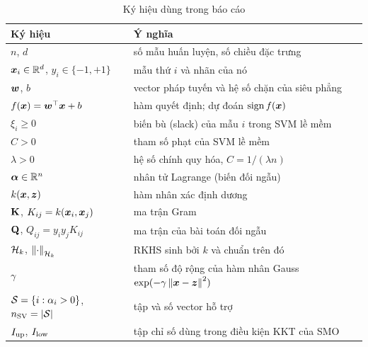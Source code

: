 \begin{table}[H]
\centering
\caption{Ký hiệu dùng trong báo cáo}\label{tab:notation}
\begin{tabular}{@{}ll@{}}
\toprule
Ký hiệu & Ý nghĩa \\
\midrule
$n$, $d$ & số mẫu huấn luyện, số chiều đặc trưng \\
$\bm{x}_i \in \mathbb{R}^d$, $y_i \in \{-1, +1\}$ & mẫu thứ $i$ và nhãn của nó \\
$\bm{w}$, $b$ & vector pháp tuyến và hệ số chặn của siêu phẳng \\
$f(\bm{x}) = \bm{w}^{\top}\bm{x} + b$ & hàm quyết định; dự đoán $\operatorname{sign} f(\bm{x})$ \\
$\xi_i \ge 0$ & biến bù (slack) của mẫu $i$ trong SVM lề mềm \\
$C > 0$ & tham số phạt của SVM lề mềm \\
$\lambda > 0$ & hệ số chính quy hóa, $C = 1/(\lambda n)$ \\
$\bm{\alpha} \in \mathbb{R}^n$ & nhân tử Lagrange (biến đối ngẫu) \\
$k(\bm{x}, \bm{z})$ & hàm nhân xác định dương \\
$\mathbf{K}$, $K_{ij} = k(\bm{x}_i, \bm{x}_j)$ & ma trận Gram \\
$\mathbf{Q}$, $Q_{ij} = y_i y_j K_{ij}$ & ma trận của bài toán đối ngẫu \\
$\mathcal{H}_k$, $\left\lVert \cdot \right\rVert_{\mathcal{H}_k}$ & RKHS sinh bởi $k$ và chuẩn trên đó \\
$\gamma$ & tham số độ rộng của hàm nhân Gauss $\exp(-\gamma\left\lVert \bm{x} - \bm{z} \right\rVert^2)$ \\
$\mathcal{S} = \{i : \alpha_i > 0\}$, $n_{\mathrm{SV}} = \left\lvert \mathcal{S} \right\rvert$ & tập và số vector hỗ trợ \\
$I_{\mathrm{up}}$, $I_{\mathrm{low}}$ & tập chỉ số dùng trong điều kiện KKT của SMO \\
\bottomrule
\end{tabular}
\end{table}

